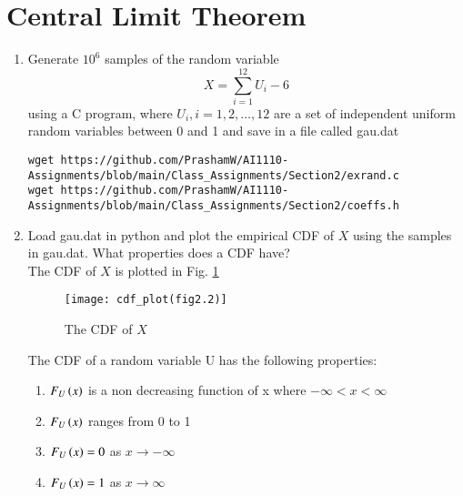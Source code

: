 \documentclass[journal,12pt,twocolumn]{IEEEtran}
\renewcommand\thesection{\arabic{section}}
\begin{document}
\section{Central Limit Theorem}
%
\begin{enumerate}[label=\thesection.\arabic*
,ref=\thesection.\theenumi]
%
\item
Generate $10^6$ samples of the random variable
%
\begin{equation}
X = \sum_{i=1}^{12}U_i -6
\end{equation}
%
using a C program, where $U_i, i = 1,2,\dots, 12$ are  a set of independent uniform random variables between 0 and 1
and save in a file called gau.dat\\
\solution
\begin{lstlisting}
wget https://github.com/PrashamW/AI1110-Assignments/blob/main/Class_Assignments/Section2/exrand.c
wget https://github.com/PrashamW/AI1110-Assignments/blob/main/Class_Assignments/Section2/coeffs.h
\end{lstlisting}
%
\item
Load gau.dat in python and plot the empirical CDF of $X$ using the samples in gau.dat. What properties does a CDF have?
\\
\solution The CDF of $X$ is plotted in Fig. \ref{fig:cdf_plot(fig2.2)}\\
\begin{figure}
\centering
\texttt{[image: cdf\_plot(fig2.2)]}
\caption{The CDF of $X$}
\label{fig:cdf_plot(fig2.2)}
\end{figure}
The CDF of a random variable U has the following properties:
\begin{enumerate}
    \item $F_{U}\left(x\right)$ is a non decreasing function of x where $-\infty < x < \infty$ 
    \item $F_{U}\left(x\right)$ ranges from 0 to 1 
    \item $F_{U}\left(x\right) = 0$ as $x \rightarrow -\infty$ 
    \item $F_{U}\left(x\right) = 1$ as $x \rightarrow \infty$
\end{enumerate}
				

\end{enumerate}
\end{document}
